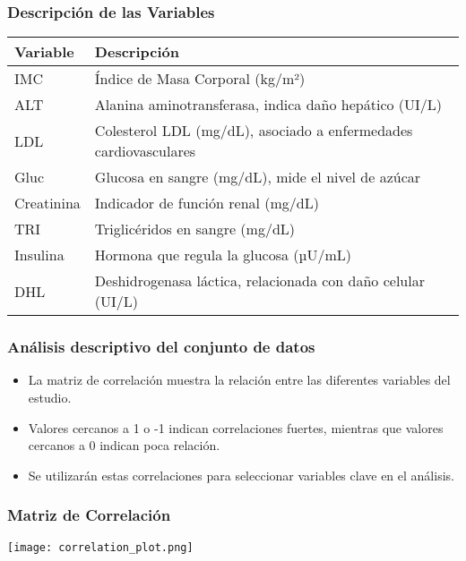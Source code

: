 \documentclass[
	11pt, %
]{beamer}
\begin{document}
\begin{frame}
    \frametitle{Descripción de las Variables} %
    \scriptsize %
    \begin{table}[]
        \centering
        \begin{tabular}{ll}
            \hline
            \textbf{Variable} & \textbf{Descripción} \\
            \hline
            IMC & Índice de Masa Corporal (kg/m²) \\
            ALT & Alanina aminotransferasa, indica daño hepático (UI/L) \\
            LDL & Colesterol LDL (mg/dL), asociado a enfermedades cardiovasculares \\
            Gluc & Glucosa en sangre (mg/dL), mide el nivel de azúcar \\
            Creatinina & Indicador de función renal (mg/dL) \\
            TRI & Triglicéridos en sangre (mg/dL) \\
            Insulina & Hormona que regula la glucosa (µU/mL) \\
            DHL & Deshidrogenasa láctica, relacionada con daño celular (UI/L) \\
            \hline
        \end{tabular}
    \end{table}
\end{frame}


\begin{frame}
    \frametitle{Análisis descriptivo del conjunto de datos} %
    \begin{itemize}
        \item La matriz de correlación muestra la relación entre las diferentes variables del estudio.
        \item Valores cercanos a 1 o -1 indican correlaciones fuertes, mientras que valores cercanos a 0 indican poca relación.
        \item Se utilizarán estas correlaciones para seleccionar variables clave en el análisis.
    \end{itemize}
\end{frame}


\begin{frame}
    \frametitle{Matriz de Correlación} %
    \begin{center}
        \texttt{[image: correlation\_plot.png]} %
    \end{center}
\end{frame}
\end{document}
